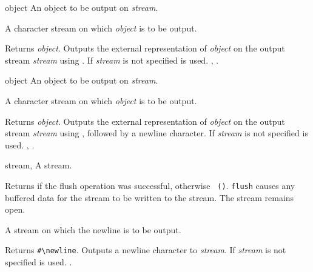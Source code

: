 \begin{optDefinition}
\begin{arguments}
    \item[object] An object to be output on {\em stream}.
    \item[\optional{stream}] A character stream on which {\em object\/} is to
    be output.
\end{arguments}
%
\result%
Returns {\em object}.
%
\remarks%
Outputs the external representation of {\em object\/} on the output
stream {\em stream\/} using .  If {\em stream\/} is
not specified  is used.
%
\seealso%
, .

\begin{arguments}
    \item[object] An object to be output on {\em stream}.
    \item[\optional{stream}] A character stream on which {\em object\/} is
    to be output.
\end{arguments}
%
\result%
Returns {\em object}.
%
\remarks%
Outputs the external representation of {\em object\/} on the output
stream {\em stream\/} using , followed by a newline
character.  If {\em stream\/} is not specified  is used.
%
\seealso%
, .

\begin{genericargs}
    \item[stream, \classref{stream}] A stream.
\end{genericargs}
%
\result%
Returns \true\/ if the flush operation was successful, otherwise {\tt
    ()}.
%
\remarks%
{\tt flush} causes any buffered data for the stream to be written to
the stream. The stream remains open.

\begin{arguments}
    \item[\optional{stream}] A stream on which the newline is to be output.
\end{arguments}
%
\result%
Returns \verb|#\newline|.
%
\remarks%
Outputs a newline character to {\em stream}.  If {\em stream\/} is not
specified  is used.
%
\seealso%
.


\end{optDefinition}
